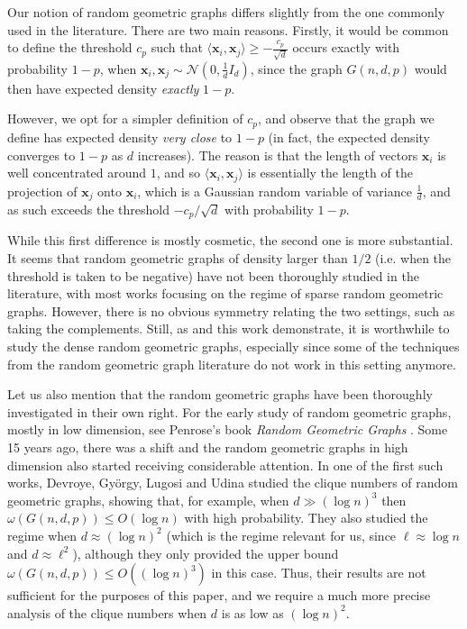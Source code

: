 \documentclass[11pt]{amsart}
\theoremstyle{definition}
\def\cN{\mathcal{N}}
\def\bx{\boldsymbol{x}}
\begin{document}
Our notion of random geometric graphs differs slightly from the one commonly used in the literature. There are two main reasons. Firstly, it would be common to define the threshold $c_p$ such that $\langle \bx_i, \bx_j\rangle\geq -\frac{c_p}{\sqrt{d}}$ occurs exactly with probability $1-p$, when $\bx_i, \bx_j\sim \cN(0, \frac{1}{d}I_d)$, since the graph $G(n, d, p)$ would then have expected density \textit{exactly} $1-p$.

However, we opt for a simpler definition of $c_p$, and observe that the graph we define has expected density \textit{very close} to $1-p$ (in fact, the expected density converges to $1-p$ as $d$ increases). The reason is that the length of vectors $\bx_i$ is well concentrated around $1$, and so $\langle \bx_i, \bx_j\rangle$ is essentially the length of the projection of $\bx_j$ onto $\bx_i$, which is a Gaussian random variable of variance $\frac{1}{d}$, and as such exceeds the threshold $-c_p/\sqrt{d}$ with probability $1-p$.

While this first difference is mostly cosmetic, the second one is more substantial. It seems that random geometric graphs of density larger than $1/2$ (i.e. when the threshold is taken to be negative) have not been thoroughly studied in the literature, with most works focusing on the regime of sparse random geometric graphs. However, there is no obvious symmetry relating the two settings, such as taking the complements. Still, as \cite{MSX25} and this work demonstrate, it is worthwhile to study the dense random geometric graphs, especially since some of the techniques from the random geometric graph literature do not work in this setting anymore.

Let us also mention that the random geometric graphs have been thoroughly investigated in their own right. For the early study of random geometric graphs, mostly in low dimension, see Penrose's book \textit{Random Geometric Graphs} \cite{Pen03}. Some 15 years ago, there was a shift and the random geometric graphs in high dimension also started receiving considerable attention. In one of the first such works, Devroye, Gy\"orgy, Lugosi and Udina \cite{DGLU11} studied the clique numbers of random geometric graphs, showing that, for example, when $d\gg (\log n)^3$ then $\omega(G(n, d, p))\leq O(\log n)$ with high probability. They also studied the regime when $d\approx (\log n)^2$ (which is the regime relevant for us, since $\ell\approx \log n$ and $d\approx \ell^2$), although they only provided the upper bound $\omega(G(n, d, p))\leq O((\log n)^3)$ in this case. Thus, their results are not sufficient for the purposes of this paper, and we require a much more precise analysis of the clique numbers when $d$ is as low as $(\log n)^2$.
\end{document}
